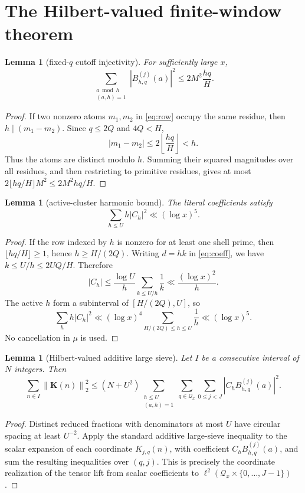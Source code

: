 \documentclass[11pt]{article}
\newtheorem{lemma}[theorem]{Lemma}
\theoremstyle{remark}
\newcommand{\Qx}{\mathcal Q_x}
\newcommand{\Kvec}{\mathbf K}
\newcommand{\Kjq}{K_{j,q}}
\newcommand{\norm}[1]{\left\lVert #1\right\rVert}
\begin{document}
\section{The Hilbert-valued finite-window theorem}

\begin{lemma}[fixed-$q$ cutoff injectivity]
\label{lem:inject}
For sufficiently large $x$,
\[
 \sum_{\substack{a\bmod h\\(a,h)=1}}
   \left|B_{h,q}^{(j)}(a)\right|^2
 \leq 2M^2\frac{hq}{H}.
\]
\end{lemma}

\begin{proof}
If two nonzero atoms $m_1,m_2$ in \eqref{eq:row} occupy the same residue,
then $h\mid(m_1-m_2)$.  Since $q\leq 2Q$ and $4Q<H$,
\[
 |m_1-m_2|
 \leq 2\left\lfloor\frac{hq}{H}\right\rfloor<h.
\]
Thus the atoms are distinct modulo $h$.  Summing their squared magnitudes over
all residues, and then restricting to primitive residues, gives at most
$2\lfloor hq/H\rfloor M^2\leq 2M^2hq/H$.
\end{proof}

\begin{lemma}[active-cluster harmonic bound]
\label{lem:cluster}
The literal coefficients satisfy
\[
 \sum_{h\leq U}h|C_h|^2\ll(\log x)^5.
 \label{eq:cluster}
\]
\end{lemma}

\begin{proof}
If the row indexed by $h$ is nonzero for at least one shell prime, then
$\lfloor hq/H\rfloor\geq1$, hence $h\geq H/(2Q)$.  Writing $d=hk$ in
\eqref{eq:coeff}, we have $k\leq U/h\leq 2UQ/H$.  Therefore
\[
 |C_h|
 \leq \frac{\log U}{h}\sum_{k\leq U/h}\frac1k
 \ll \frac{(\log x)^2}{h}.
\]
The active $h$ form a subinterval of $[H/(2Q),U]$, so
\[
 \sum_hh|C_h|^2
 \ll(\log x)^4\sum_{H/(2Q)\leq h\leq U}\frac1h
 \ll(\log x)^5.
\]
No cancellation in $\mu$ is used.
\end{proof}

\begin{lemma}[Hilbert-valued additive large sieve]
\label{lem:hilbert}
Let $I$ be a consecutive interval of $N$ integers.  Then
\[
 \sum_{n\in I}\norm{\Kvec(n)}_2^2
 \leq (N+U^2)
 \sum_{\substack{h\leq U\\(a,h)=1}}
 \sum_{q\in\Qx}\sum_{0\leq j<J}
 |C_hB_{h,q}^{(j)}(a)|^2.
 \label{eq:hilbert}
\]
\end{lemma}

\begin{proof}
Distinct reduced fractions with denominators at most $U$ have circular
spacing at least $U^{-2}$.  Apply the standard additive large-sieve inequality
\cite{MontgomeryVaughan1973} to the scalar expansion of each coordinate
$\Kjq(n)$, with coefficient $C_hB_{h,q}^{(j)}(a)$, and sum the resulting
inequalities over $(q,j)$.  This is precisely the coordinate realization of
the tensor lift from scalar coefficients to
$\ell^2(\Qx\times\{0,\ldots,J-1\})$.
\end{proof}
\end{document}
